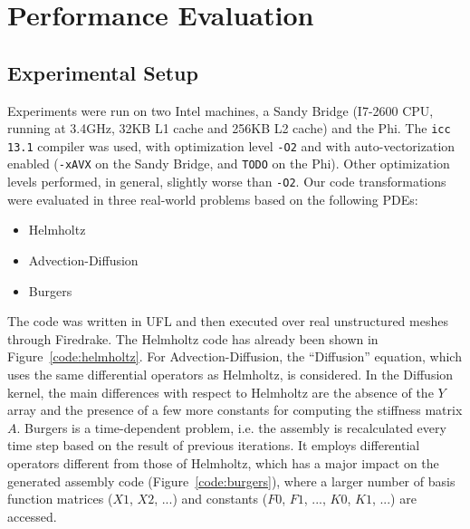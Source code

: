 \documentclass[conference]{IEEEtran}
\begin{document}
\section{Performance Evaluation}
\label{sec:perf-results}

\subsection{Experimental Setup}

Experiments were run on two Intel machines, a Sandy Bridge (I7-2600 CPU, running at 3.4GHz, 32KB L1 cache and 256KB L2 cache) and the Phi. The \texttt{icc 13.1} compiler was used, with optimization level \texttt{-O2} and with auto-vectorization enabled (\texttt{-xAVX} on the Sandy Bridge, and \texttt{TODO} on the Phi). Other optimization levels performed, in general, slightly worse than \texttt{-O2}. Our code transformations were evaluated in three real-world problems based on the following PDEs:
\begin{itemize}
\item Helmholtz
\item Advection-Diffusion
\item Burgers
\end{itemize}
The code was written in UFL and then executed over real unstructured meshes through Firedrake. The Helmholtz code has already been shown in Figure~\ref{code:helmholtz}. For Advection-Diffusion, the ``Diffusion'' equation, which uses the same differential operators as Helmholtz, is considered. In the Diffusion kernel, the main differences with respect to Helmholtz are the absence of the $Y$ array and the presence of a few more constants for computing the stiffness matrix $A$. Burgers is a time-dependent problem, i.e. the assembly is recalculated every time step based on the result of previous iterations. It employs differential operators different from those of Helmholtz, which has a major impact on the generated assembly code (Figure~\ref{code:burgers}), where a larger number of basis function matrices ($X1$, $X2$, ...) and constants ($F0$, $F1$, ..., $K0$, $K1$, ...) are accessed.
\end{document}
